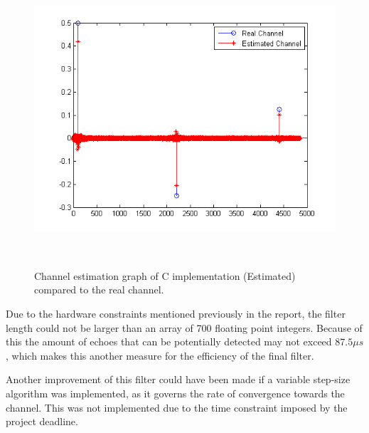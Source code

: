 \documentclass[a4paper,11pt,twoside]{article}
\begin{document}
\begin{figure} \
  \centering  
	\includegraphics[width=1\textwidth]{Impuse_Response.png}
  	\caption{Channel estimation graph of C implementation (Estimated) compared to the real channel.}
  	\label{fig:impulse}
\ \end{figure}

Due to the hardware constraints mentioned previously in the report, the filter length could not be larger than an array of 700 floating point integers. Because of this the amount of echoes that can be potentially detected may not exceed $87.5 \mu s$, which makes this another measure for the efficiency of the final filter.

Another improvement of this filter could have been made if a variable step-size algorithm was implemented, as it governs the rate of convergence towards the channel. This was not implemented due to the time constraint imposed by the project deadline.




%
%
\end{document}
